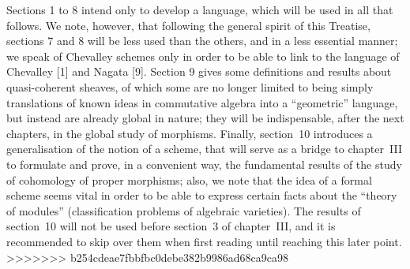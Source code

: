 \documentclass[../main.tex]{subfile}
\begin{document}
Sections 1 to 8 intend only to develop a language, which will be used in all that follows.
We note, however, that following the general spirit of this Treatise, sections 7 and 8 will be less used than the others, and in a less essential manner; we speak of Chevalley schemes only in order to be able to link to the language of Chevalley [1] and Nagata [9].
Section 9 gives some definitions and results about quasi-coherent sheaves, of which some are no longer limited to being simply translations of known ideas in commutative algebra into a ``geometric'' language, but instead are already global in nature; they will be indispensable, after the next chapters, in the global study of morphisms.
Finally, section~10 introduces a generalisation of the notion of a scheme, that will serve as a bridge to chapter~III to formulate and prove, in a convenient way, the fundamental results of the study of cohomology of proper morphisms; also, we note that the idea of a formal scheme seems vital in order to be able to express certain facts about the ``theory of modules'' (classification problems of algebraic varieties).
The results of section~10 will not be used before section~3 of chapter~III, and it is recommended to skip over them when first reading until reaching this later point.
>>>>>>> b254cdeae7fbbfbc0debe382b9986ad68ca9ca98
\end{document}
